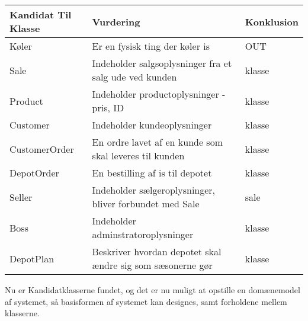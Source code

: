 \begin{longtable}{ |p{120pt}|p{120pt}|p{120pt}| }\label{fig:Kandidatklasser}
    \textbf{Kandidat Til Klasse} & \textbf{Vurdering} & \textbf{Konklusion} \\
    \hline
    Køler & Er en fysisk ting der køler is & OUT \\
    \hline
    Sale & Indeholder salgsoplysninger fra et salg ude ved kunden & klasse \\
    \hline
    Product & Indeholder productoplysninger - pris, ID & klasse \\
    \hline
    Customer & Indeholder kundeoplysninger & klasse \\
    \hline
    CustomerOrder & En ordre lavet af en kunde som skal leveres til kunden & klasse \\
    \hline
    DepotOrder & En bestilling af is til depotet & klasse \\
    \hline
    Seller & Indeholder sælgeroplysninger, bliver forbundet med Sale & sale \\
    \hline
    Boss & Indeholder adminstratoroplysninger & klasse \\
    \hline
    DepotPlan & Beskriver hvordan depotet skal ændre sig som sæsonerne gør & klasse \\
    \hline
\end{longtable}
Nu er Kandidatklasserne fundet, og det er nu muligt at opstille en domænemodel af systemet, så basisformen af systemet kan designes, samt forholdene mellem klasserne.
